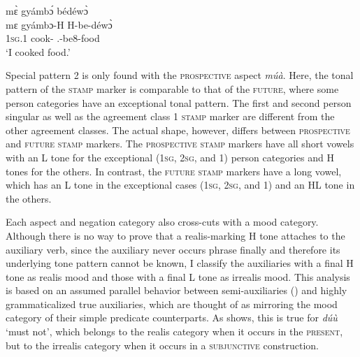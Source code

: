 \ea\label{nzii1a}
  \glll  mɛ̀ gyámbɔ́ bédéwɔ̀ \\
         mɛ gyámbɔ-H H-be-déwɔ̀ \\
            1\textsc{sg}.{\PST}1 cook-{\R} {\OBJ}.{\LINK}-be8-food\\
    \trans `I cooked food.'
\z



Special pattern 2 is only found with the \textsc{prospective} aspect {\itshape múà}. Here, the tonal pattern of the \textsc{stamp} marker is comparable to that of the \textsc{future}, where some person categories have an exceptional tonal pattern. The first and second person singular as well as the agreement class 1 \textsc{stamp} marker are different from the other agreement classes. The actual shape, however, differs between \textsc{prospective} and \textsc{future} \textsc{stamp} markers. The \textsc{prospective} \textsc{stamp} markers have all short vowels with an L tone for the exceptional (1\textsc{sg}, 2\textsc{sg}, and 1) person categories and H tones for the others. In contrast, the \textsc{future} \textsc{stamp} markers have a long vowel, which has an L tone in the exceptional cases (1\textsc{sg}, 2\textsc{sg}, and 1) and an HL tone in the others.


Each aspect and negation category also cross-cuts with a mood category. Although there is no way to prove that a realis-marking H tone attaches to the auxiliary verb, since the auxiliary never occurs phrase finally and therefore its underlying tone pattern cannot be known, I classify the auxiliaries with a final H tone as realis mood and those with a final L tone as irrealis mood. This analysis is based on an assumed parallel behavior between semi-auxiliaries () and highly grammaticalized true auxiliaries, which are thought of as mirroring the mood category of their simple predicate counterparts.  As  shows, this is true for {\itshape dúù} `must not', which belongs to the realis category when it occurs in the \textsc{present}, but to the irrealis category when it occurs in a \textsc{subjunctive} construction.


